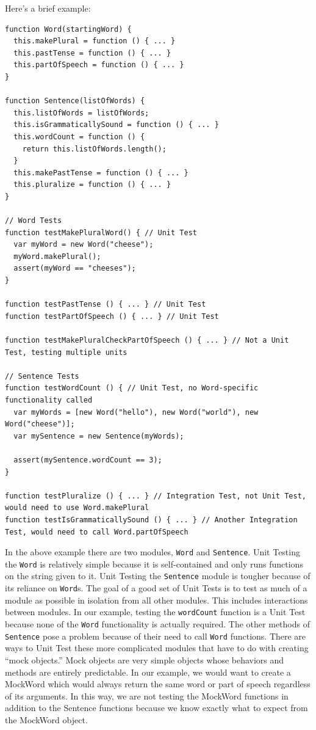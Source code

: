 \documentclass[12pt]{ucthesis}
\begin{document}
Here's a brief example:
\begin{lstlisting}
function Word(startingWord) {
  this.makePlural = function () { ... }
  this.pastTense = function () { ... }
  this.partOfSpeech = function () { ... }
}

function Sentence(listOfWords) {
  this.listOfWords = listOfWords;
  this.isGrammaticallySound = function () { ... }
  this.wordCount = function () {
    return this.listOfWords.length();
  }
  this.makePastTense = function () { ... }
  this.pluralize = function () { ... }
}

// Word Tests
function testMakePluralWord() { // Unit Test
  var myWord = new Word("cheese");
  myWord.makePlural();
  assert(myWord == "cheeses");
}

function testPastTense () { ... } // Unit Test
function testPartOfSpeech () { ... } // Unit Test

function testMakePluralCheckPartOfSpeech () { ... } // Not a Unit Test, testing multiple units

// Sentence Tests
function testWordCount () { // Unit Test, no Word-specific functionality called
  var myWords = [new Word("hello"), new Word("world"), new Word("cheese")];
  var mySentence = new Sentence(myWords);

  assert(mySentence.wordCount == 3);
}

function testPluralize () { ... } // Integration Test, not Unit Test, would need to use Word.makePlural
function testIsGrammaticallySound () { ... } // Another Integration Test, would need to call Word.partOfSpeech

\end{lstlisting}

In the above example there are two modules, \lstinline{Word} and \lstinline{Sentence}. Unit Testing the \lstinline{Word} is relatively simple because it is self-contained and only runs functions on the string given to it. Unit Testing the \lstinline{Sentence} module is tougher because of its reliance on \lstinline{Word}s. The goal of a good set of Unit Tests is to test as much of a module as possible in isolation from all other modules. This includes interactions between modules. In our example, testing the \lstinline{wordCount} function is a Unit Test because none of the \lstinline{Word} functionality is actually required. The other methods of \lstinline{Sentence} pose a problem because of their need to call \lstinline{Word} functions. There are ways to Unit Test these more complicated modules that have to do with creating ``mock objects.'' Mock objects are very simple objects whose behaviors and methods are entirely predictable. In our example, we would want to create a MockWord which would always return the same word or part of speech regardless of its arguments. In this way, we are not testing the MockWord functions in addition to the Sentence functions because we know exactly what to expect from the MockWord object. 
\end{document}

